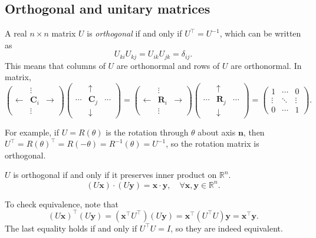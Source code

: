 \documentclass[a4paper]{article}
\begin{document}
    \subsection{Orthogonal and unitary matrices}
    \begin{definition}
      A real $ n\times n $ matrix $U$ is \textit{orthogonal} if and
      only if $ U^{\top}=U^{-1} $, which can be written as
      \[
        U_{ki}U_{kj}=U_{ik}U_{jk}=\delta_{ij}
      .\]
      This means that columns of $U$ are orthonormal and rows of $U$
      are orthonormal. In matrix,
      \[
        \begin{pmatrix}
          &\vdots&\\
          \leftarrow & \mathbf{C}_i& \rightarrow \\
          &\vdots&
        \end{pmatrix}
        \begin{pmatrix}
          &\uparrow&\\
          \cdots&\mathbf{C}_j&\cdots\\
          &\downarrow &
        \end{pmatrix}
        =
        \begin{pmatrix}
          &\vdots&\\
          \leftarrow & \mathbf{R}_i& \rightarrow \\
          &\vdots&
        \end{pmatrix}
        \begin{pmatrix}
          &\uparrow&\\
          \cdots&\mathbf{R}_j&\cdots\\
          &\downarrow &
        \end{pmatrix}
        =
        \begin{pmatrix}
          1&\cdots&0\\
          \vdots&\ddots &\vdots \\
          0&\cdots &1
        \end{pmatrix}
      .\]
    \end{definition}
    For example, if $U=R(\theta)$ is the rotation through $ \theta $
    about axis $\mathbf{n}$, then $
    U^{\top}=R(\theta)^{\top}=R(-\theta)=R^{-1}(\theta)=U^{-1} $, so
    the rotation matrix is orthogonal.

    \begin{definition}
      $U$ is orthogonal if and only if it preserves inner product on
      $ \mathbb{R}^{n} $.
      \[
        (U \mathbf{x})\cdot (U \mathbf{y})=\mathbf{x}\cdot
        \mathbf{y}, \quad \forall \mathbf{x},\mathbf{y}\in \mathbb{R}^{n}
      .\]
    \end{definition}
    To check equivalence, note that
    \[
      (U \mathbf{x})^{\top}(U \mathbf{y})=(\mathbf{x}^{\top}
      U^{\top})(U
      \mathbf{y})=\mathbf{x}^{\top}(U^{\top}U)\mathbf{y}=\mathbf{x}^{\top}
      \mathbf{y}
    .\]
    The last equality holds if and only if $ U^{\top}U=I $, so they
    are indeed equivalent.
\end{document}
